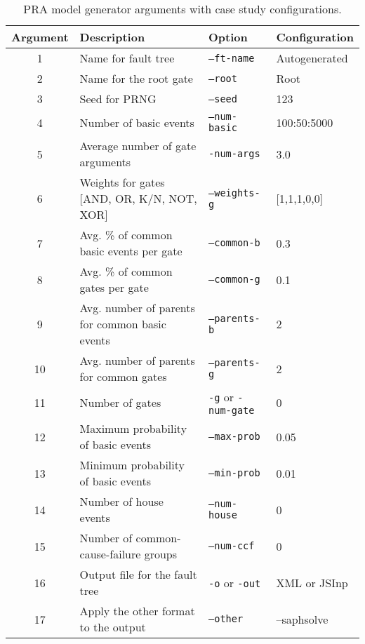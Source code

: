 \begin{table}[htbp]
    \centering
    \caption{PRA model generator arguments with case study configurations.}
    \label{tab:model_generator_parameters}
    \begin{tabular}{|c|l|l|l|}
        \hline
        \textbf{Argument} & \textbf{Description} & \textbf{Option} & \textbf{Configuration} \\
        \hline
        1 & Name for fault tree & \texttt{--ft-name} & Autogenerated \\
        2 & Name for the root gate & \texttt{--root} & Root \\
        3 & Seed for PRNG & \texttt{--seed} & 123 \\
        4 & Number of basic events & \texttt{--num-basic} & 100:50:5000 \\
        5 & Average number of gate arguments & \texttt{-num-args} & 3.0 \\
        6 & Weights for gates [AND, OR, K/N, NOT, XOR] & \texttt{--weights-g} & [1,1,1,0,0] \\
        7 & Avg. \% of common basic events per gate & \texttt{--common-b} & 0.3 \\
        8 & Avg. \% of common gates per gate & \texttt{--common-g} & 0.1 \\
        9 & Avg. number of parents for common basic events & \texttt{--parents-b} & 2 \\
        10 & Avg. number of parents for common gates & \texttt{--parents-g} & 2 \\
        11 & Number of gates & \texttt{-g} or \texttt{-num-gate} & 0 \\
        12 & Maximum probability of basic events & \texttt{---max-prob} & 0.05 \\
        13 & Minimum probability of basic events & \texttt{--min-prob} & 0.01 \\
        14 & Number of house events & \texttt{--num-house} & 0 \\
        15 & Number of common-cause-failure groups & \texttt{--num-ccf} & 0 \\
        16 & Output file for the fault tree & \texttt{-o} or \texttt{-out} & XML or JSInp \\
        17 & Apply the other format to the output & \texttt{--other} & --saphsolve \\
        \hline
    \end{tabular}
\end{table}
